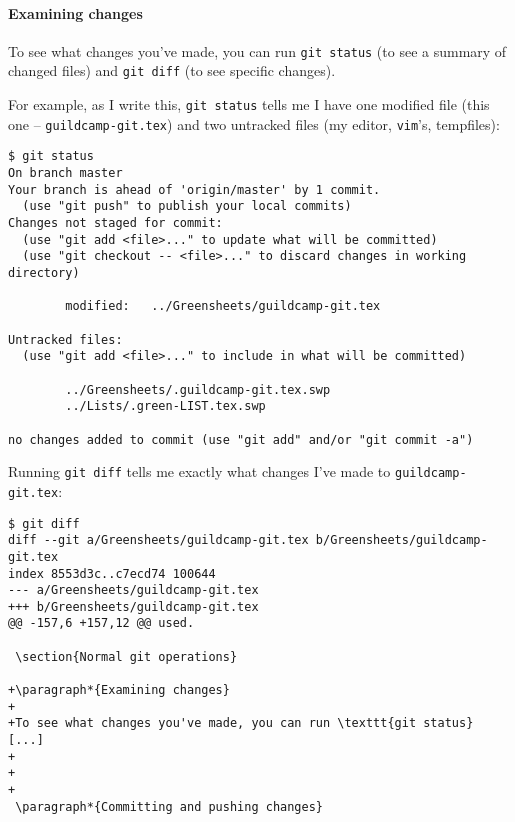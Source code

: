 \documentclass[green]{testgame}
\begin{document}
\paragraph*{Examining changes}

To see what changes you've made, you can run \texttt{git status} (to see a summary of changed files) and \texttt{git diff} (to see specific changes).

For example, as I write this, \texttt{git status} tells me I have one modified file (this one -- \texttt{guildcamp-git.tex}) and two untracked files (my editor, \texttt{vim}'s, tempfiles):
\begin{verbatim}
$ git status
On branch master
Your branch is ahead of 'origin/master' by 1 commit.
  (use "git push" to publish your local commits)
Changes not staged for commit:
  (use "git add <file>..." to update what will be committed)
  (use "git checkout -- <file>..." to discard changes in working directory)

        modified:   ../Greensheets/guildcamp-git.tex

Untracked files:
  (use "git add <file>..." to include in what will be committed)

        ../Greensheets/.guildcamp-git.tex.swp
        ../Lists/.green-LIST.tex.swp

no changes added to commit (use "git add" and/or "git commit -a")
\end{verbatim}

Running \texttt{git diff} tells me exactly what changes I've made to \texttt{guildcamp-git.tex}:
\begin{verbatim}
$ git diff
diff --git a/Greensheets/guildcamp-git.tex b/Greensheets/guildcamp-git.tex
index 8553d3c..c7ecd74 100644
--- a/Greensheets/guildcamp-git.tex
+++ b/Greensheets/guildcamp-git.tex
@@ -157,6 +157,12 @@ used.

 \section{Normal git operations}

+\paragraph*{Examining changes}
+
+To see what changes you've made, you can run \texttt{git status} [...]
+
+
+
 \paragraph*{Committing and pushing changes}
\end{verbatim}
\end{document}
